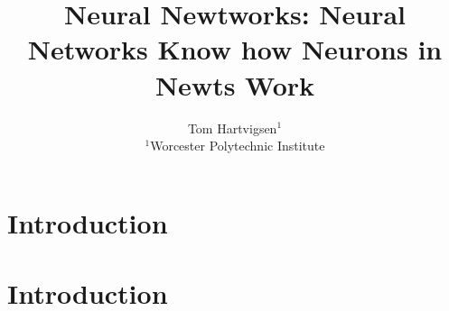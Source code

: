 





\title{Neural Newtworks: Neural Networks Know how Neurons in Newts Work}
\author{
    Tom Hartvigsen$^1$\\
    \affiliations
    $^1$Worcester Polytechnic Institute\\
}



\maketitle

\begin{abstract}
    
\end{abstract}

\section{Introduction}
    
\section{Introduction}





